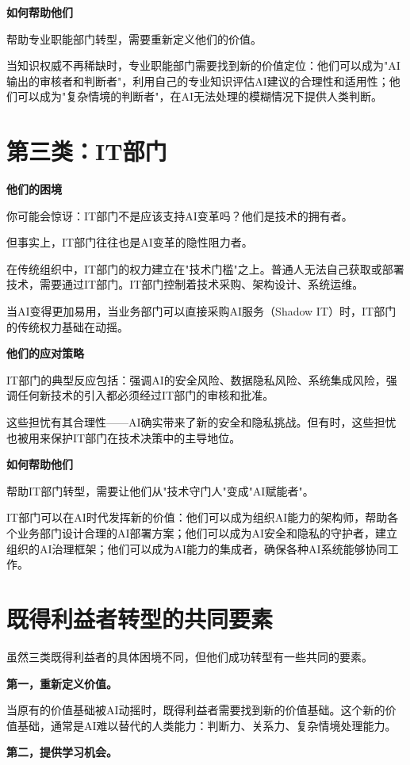 \textbf{如何帮助他们}

帮助专业职能部门转型，需要重新定义他们的价值。

当知识权威不再稀缺时，专业职能部门需要找到新的价值定位：他们可以成为"AI输出的审核者和判断者"，利用自己的专业知识评估AI建议的合理性和适用性；他们可以成为"复杂情境的判断者"，在AI无法处理的模糊情况下提供人类判断。

\section{第三类：IT部门}


\textbf{他们的困境}

你可能会惊讶：IT部门不是应该支持AI变革吗？他们是技术的拥有者。

但事实上，IT部门往往也是AI变革的隐性阻力者。

在传统组织中，IT部门的权力建立在"技术门槛"之上。普通人无法自己获取或部署技术，需要通过IT部门。IT部门控制着技术采购、架构设计、系统运维。

当AI变得更加易用，当业务部门可以直接采购AI服务（Shadow IT）时，IT部门的传统权力基础在动摇。

\textbf{他们的应对策略}

IT部门的典型反应包括：强调AI的安全风险、数据隐私风险、系统集成风险，强调任何新技术的引入都必须经过IT部门的审核和批准。

这些担忧有其合理性——AI确实带来了新的安全和隐私挑战。但有时，这些担忧也被用来保护IT部门在技术决策中的主导地位。

\textbf{如何帮助他们}

帮助IT部门转型，需要让他们从"技术守门人"变成"AI赋能者"。

IT部门可以在AI时代发挥新的价值：他们可以成为组织AI能力的架构师，帮助各个业务部门设计合理的AI部署方案；他们可以成为AI安全和隐私的守护者，建立组织的AI治理框架；他们可以成为AI能力的集成者，确保各种AI系统能够协同工作。

\section{既得利益者转型的共同要素}


虽然三类既得利益者的具体困境不同，但他们成功转型有一些共同的要素。

\textbf{第一，重新定义价值。}

当原有的价值基础被AI动摇时，既得利益者需要找到新的价值基础。这个新的价值基础，通常是AI难以替代的人类能力：判断力、关系力、复杂情境处理能力。

\textbf{第二，提供学习机会。}

